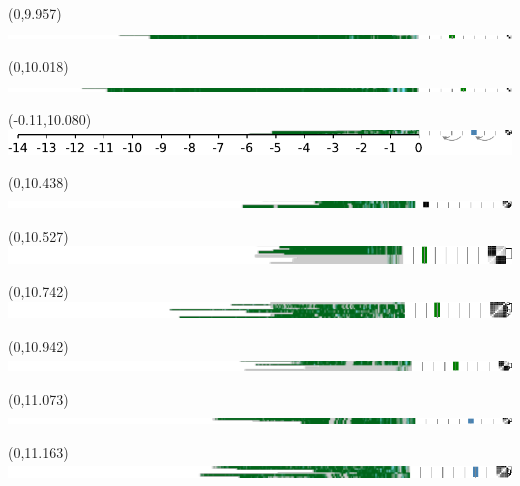 \documentclass{article}
\begin{document}
\begin{textblock}{13}(0,9.957)\includegraphics{./Figure_S4/chr9-HG003.pdf}\end{textblock}
\begin{textblock}{13}(0,10.018)\includegraphics{./Figure_S4/chr9-HG004.pdf}\end{textblock}
\begin{textblock}{13}(-0.11,10.080)\includegraphics{./Figure_S4/chr9-HG005.pdf}\end{textblock}
\begin{textblock}{13}(0,10.438)\includegraphics{./Figure_S4/chr12-HG001.pdf}\end{textblock}
\begin{textblock}{13}(0,10.527)\includegraphics{./Figure_S4/chr12-HG002.pdf}\end{textblock}
\begin{textblock}{13}(0,10.742)\includegraphics{./Figure_S4/chr12-HG003.pdf}\end{textblock}
\begin{textblock}{13}(0,10.942)\includegraphics{./Figure_S4/chr12-HG004.pdf}\end{textblock}
\begin{textblock}{13}(0,11.073)\includegraphics{./Figure_S4/chr12-HG005.pdf}\end{textblock}
\begin{textblock}{13}(0,11.163)\includegraphics{./Figure_S4/chr12-HG006.pdf}\end{textblock}
\end{document}
